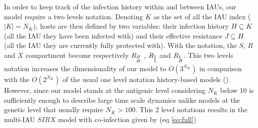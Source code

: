 In order to keep track of the infection history within and between
IAUs, our model require a two levels notation. Denoting $K$ as the set
of all the IAU index ($|K|=N_{K}$), hosts are then defined by two
variables: their infection history $H\subseteq K$ (all the IAU they
have been infected with) and their effective resistance $J\subseteq H$
(all the IAU they are currently fully protected with). With the
notation, the $S$, $R$ and $X$ compartment
become respectively $R_{\begin{subarray}{l}\varnothing \\
    \varnothing \end{subarray}}$ , $R_{\begin{subarray}{l} 1 \\
    1 \end{subarray}}$ and $R_{\begin{subarray}{l} 1 \\
    \varnothing \end{subarray}}$. This two levels notation increases
the dimensionality of our model to $O(3^{N_{K}})$ in comparison with the
$O(2^{N_{K}})$ of the usual one level notation history-based models
(\citet{Andreasen1997}). However, since our model stands at the
antigenic level considering $N_K$ below 10 is sufficiently enough to
describe large time scale dynamics unlike models at the genetic level
that usually require $N_K>100$. This 2 level notations results in the
multi-IAU $SIRX$ model with co-infection given by (eq \ref{eq:full})

